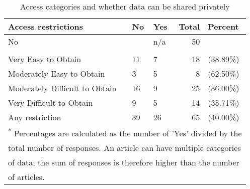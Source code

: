 \begin{table}[!h]
\centering
\caption{\label{tab:access_provision}Access categories and whether data can be shared privately}
\centering
\begin{tabular}[t]{lllrl}
\toprule
Access restrictions & No & Yes & Total & Percent\\
\midrule
No &  & n/a & 50 & \\
\midrule\\
Very Easy to Obtain & 11 & 7 & 18 & (38.89\%)\\
Moderately Easy to Obtain & 3 & 5 & 8 & (62.50\%)\\
Moderately Difficult to Obtain & 16 & 9 & 25 & (36.00\%)\\
Very Difficult to Obtain & 9 & 5 & 14 & (35.71\%)\\
\midrule
\addlinespace
Any restriction & 39 & 26 & 65 & (40.00\%)\\
\bottomrule
\multicolumn{5}{l}{\footnotesize \textsuperscript{*} Percentages are calculated as the number of 'Yes' divided by the}\\
\multicolumn{5}{l}{\footnotesize total number of responses. An article can have multiple categories}\\
\multicolumn{5}{l}{\footnotesize of data; the sum of responses is therefore higher than the number}\\
\multicolumn{5}{l}{\footnotesize of articles.}\\
\end{tabular}
\end{table}
